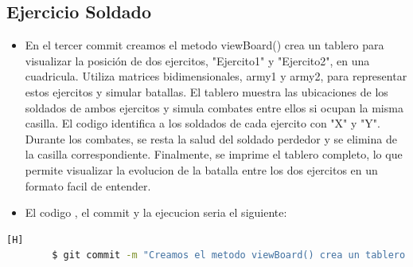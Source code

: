 \documentclass{article}
\begin{document}
	\subsection{Ejercicio Soldado}
	\begin{itemize}	
		\item En el tercer commit creamos el metodo viewBoard() crea un tablero para visualizar la posición de dos ejercitos, "Ejercito1" y "Ejercito2", en una cuadricula. Utiliza matrices bidimensionales, army1 y army2, para representar estos ejercitos y simular batallas. El tablero muestra las ubicaciones de los soldados de ambos ejercitos y simula combates entre ellos si ocupan la misma casilla. El codigo identifica a los soldados de cada ejercito con "X" y "Y". Durante los combates, se resta la salud del soldado perdedor y se elimina de la casilla correspondiente. Finalmente, se imprime el tablero completo, lo que permite visualizar la evolucion de la batalla entre los dos ejercitos en un formato facil de entender.
		\item El codigo , el commit y la ejecucion seria el siguiente:
	\end{itemize}	
	\begin{lstlisting}[language=bash,caption={Commit}][H]
		$ git commit -m "Creamos el metodo viewBoard() crea un tablero para visualizar la posicion de dos ejercitos, Ejercito1 y Ejercito2, en una cuadricula. Utiliza matrices bidimensionales, army1 y army2, para representar estos ejercitos y simular batallas. El tablero muestra las ubicaciones de los soldados de ambos ejercitos y simula combates entre ellos si ocupan la misma casilla. El codigo identifica a los soldados de cada ejercito con X y Y. Durante los combates, se resta la salud del soldado perdedor y se elimina de la casilla correspondiente. Finalmente, se imprime el tablero completo, lo que permite visualizar la evolucion de la batalla entre los dos ejercitos en un formato facil de entender."
	\end{lstlisting}	
\end{document}
